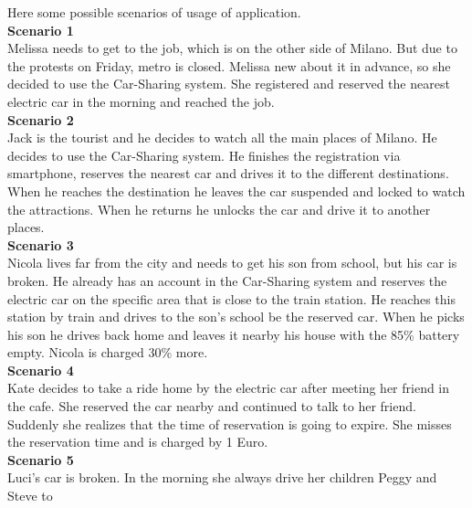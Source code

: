 \documentclass[12pt, letterpaper]{article}
\begin{document}
Here some possible scenarios of usage of application. \\
\vspace{0.5cm}
\textbf{Scenario 1} \\
\vspace{0.5cm}
Melissa needs to get to the job, which is on the other side of Milano. But due to the
protests on Friday, metro is closed. Melissa new about it in advance, so she decided to
use the Car-Sharing system. She registered and reserved the nearest electric car in the
morning and reached the job. \\
\vspace{0.5cm}
\textbf{Scenario 2} \\
\vspace{0.5cm}
Jack is the tourist and he decides to watch all the main places of Milano. He decides
to use the Car-Sharing system. He finishes the registration via smartphone, reserves
the nearest car and drives it to the different destinations. When he reaches the
destination he leaves the car suspended and locked to watch the attractions. When he
returns he unlocks the car and drive it to another places. \\
\vspace{0.5cm}
\textbf{Scenario 3} \\
\vspace{0.5cm}
Nicola lives far from the city and needs to get his son from school, but his car is
broken. He already has an account in the Car-Sharing system and reserves the electric
car on the specific area that is close to the train station. He reaches this station by train
and drives to the son’s school be the reserved car. When he picks his son he drives
back home and leaves it nearby his house with the 85\% battery empty. Nicola is
charged 30\% more. \\
\vspace{0.5cm}
\textbf{Scenario 4} \\
\vspace{0.5cm}
Kate decides to take a ride home by the electric car after meeting her friend in the
cafe. She reserved the car nearby and continued to talk to her friend. Suddenly she
realizes that the time of reservation is going to expire. She misses the reservation time
and is charged by 1 Euro. \\
\vspace{0.5cm}
\textbf{Scenario 5} \\
\vspace{0.5cm}
Luci’s car is broken. In the morning she always drive her children Peggy and Steve to
\end{document}
